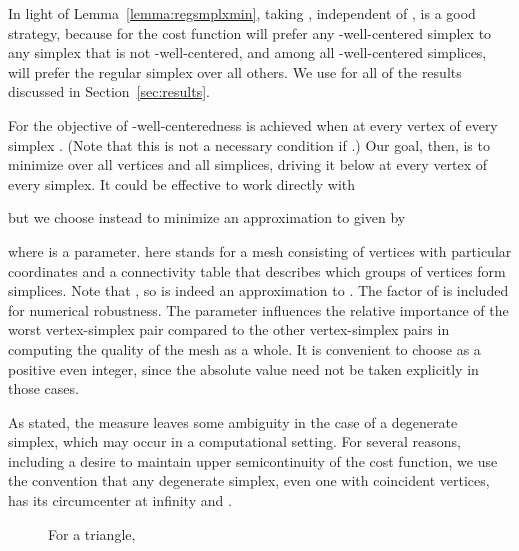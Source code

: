 \documentclass[final]{siamltex}
\begin{document}
\bigskip



In light of Lemma~\ref{lemma:regsmplxmin}, taking ,
independent of , is a good strategy, because for  the
cost function  will prefer any -well-centered simplex to any
simplex that is not -well-centered, and among all -well-centered
simplices,  will prefer the regular simplex over all others.
We use  for all of the results discussed in
Section~\ref{sec:results}.


For  the objective of -well-centeredness is achieved
when  at every vertex of every
simplex .  (Note that this is not a necessary condition if
.)
Our goal, then, is to minimize 
over all vertices and all simplices, driving it below  at every
vertex of every simplex.  It could be effective to work directly with

but we choose instead to minimize an approximation to 
given by

where  is a parameter.   here stands for a mesh consisting
of vertices  with particular coordinates and a connectivity
table  that describes which groups of vertices form simplices.
Note that , so  is indeed an
approximation to .  The factor of  is
included for numerical robustness.  The parameter  influences the
relative importance of the worst vertex-simplex pair compared to the
other vertex-simplex pairs in computing the quality of the mesh as a
whole.  It is convenient to choose  as a positive even integer,
since the absolute value need not be taken explicitly in those cases.

As stated, the measure  leaves some ambiguity in the
case of a degenerate simplex, which may occur in a computational
setting.  For several reasons, including a desire to maintain upper
semicontinuity of the cost function, we
use the convention that any degenerate
simplex, even one with coincident vertices, has its circumcenter at
infinity and .

\begin{figure}
  \centering
  \caption{For a triangle, }
  \label{fig:genE_p}
\end{figure}
 
\end{document}

